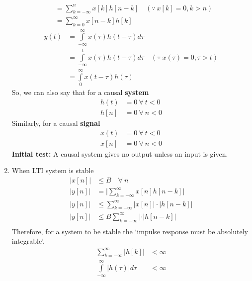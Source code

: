 \documentclass[oneside]{book}
\begin{document}
\begin{enumerate}
\begin{align*}
		           & = \sum\limits_{k = -\infty}^n x[k]h[n-k]\quad{(\because\ x[k] = 0, k>n)} \\
		           & = \sum\limits_{k = 0}^\infty x[n-k]h[k]
	      \end{align*}
	      \begin{align*}
		      y(t) & = \int\limits_{-\infty}^{\infty} x(\tau)h(t-\tau)d\tau                                \\
		           & = \int\limits_{-\infty}^t x(\tau)h(t-\tau)d\tau\quad{(\because\ x(\tau) = 0, \tau>t)} \\
		           & = \int\limits_{0}^\infty x(t-\tau)h(\tau)
	      \end{align*}
	      So, we can also say that for a causal \textbf{system}
	      \begin{align*}
		      h(t) & = 0\ \forall\ t<0 \\
		      h[n] & = 0\ \forall\ n<0
	      \end{align*}
	      Similarly, for a causal \textbf{signal}
	      \begin{align*}
		      x(t) & = 0\ \forall\ t<0 \\
		      x[n] & = 0\ \forall\ n<0
	      \end{align*}
	      \textbf{Initial test: } A causal system gives no output unless an input is given.
	\item When LTI system is stable
	      \begin{align*}
		      |x[n]| & \leq B\quad \forall\ n                                     \\
		      |y[n]| & = \bigl|\sum\limits_{k = -\infty}^{\infty}x[n]h[n-k]\bigl| \\
		      |y[n]| & \leq \sum\limits_{k = -\infty}^{\infty}|x[n]|\cdot|h[n-k]| \\
		      |y[n]| & \leq B\sum\limits_{k = -\infty}^{\infty}|\cdot|h[n-k]|     \\
	      \end{align*}
	      Therefore, for a system to be stable the `impulse response must be absolutely integrable'.
	      \begin{align*}
		      \sum\limits_{k = -\infty}^{\infty}|h[k]|     & < \infty \\
		      \int\limits_{-\infty}^{\infty}|h(\tau)|d\tau & < \infty \\
	      \end{align*}
\end{enumerate}
\end{document}
